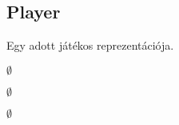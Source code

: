 \documentclass[../../projlab]{subfiles}
\begin{document}
\subsection{Player}
\begin{class-template-responsibility}
Egy adott játékos reprezentációja. 
\end{class-template-responsibility}
\begin{class-template-interface}
$\emptyset$
\end{class-template-interface}
\begin{class-template-baseclass}
$\emptyset$
\end{class-template-baseclass}
\begin{class-template-attribute}
\end{class-template-attribute}
\begin{class-template-method}
\item[] $\emptyset$
\end{class-template-method}
\end{document}
